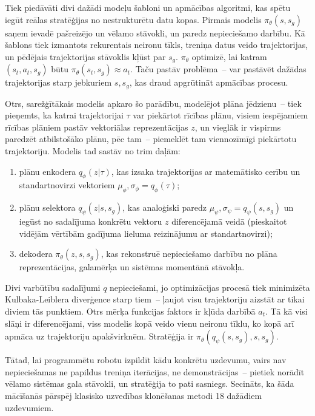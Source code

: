 \documentclass[12pt, a4paper]{article}
\numberwithin{equation}{section} %
\begin{document}
Tiek piedāvāti divi dažādi modeļu šabloni un apmācības algoritmi, kas spētu iegūt reālas stratēģijas no nestrukturētu datu kopas. Pirmais modelis $\pi_{\theta}(s,s_g)$ saņem ievadē pašreizējo un vēlamo stāvokli, un paredz nepieciešamo darbību. Kā šablons tiek izmantots rekurentais neironu tīkls, treniņa datus veido trajektorijas, un pēdējais trajektorijas stāvoklis kļūst par $s_g$. $\pi_{\theta}$ optimizē, lai katram $(s_t, a_t, s_g)$ būtu $\pi_{\theta}(s_t, s_g) \approx a_t$. Taču pastāv problēma~-- var pastāvēt dažādas trajektorijas starp jebkuriem $s, s_g$, kas draud apgrūtināt apmācības procesu.

Otrs, sarežģītākais modelis apkaro šo parādību, modelējot plāna jēdzienu~-- tiek pieņemts, ka katrai trajektorijai $\tau$ var piekārtot rīcības plānu, visiem iespējamiem rīcības plāniem pastāv vektoriālas reprezentācijas $z$, un vieglāk ir vispirms paredzēt atbilstošāko plānu, pēc tam~-- piemeklēt tam viennozīmīgi piekārtotu trajektoriju. Modelis tad sastāv no trim daļām:

\begin{enumerate}
    \item plānu enkodera $q_{\phi}(z \vert \tau)$, kas izsaka trajektorijas ar matemātisko cerību un standartnovirzi vektoriem $\mu_{\phi}, \sigma_{\phi} = q_{\phi}(\tau)$;
    \item plānu selektora $q_{\psi}(z \vert s, s_g)$, kas analoģiski paredz $\mu_{\psi}, \sigma_{\psi} = q_{\psi}(s, s_g)$ un iegūst no sadalījuma konkrētu vektoru $z$ diferencējamā veidā (pieskaitot vidējām vērtībām gadījuma lieluma reizinājumu ar standartnovirzi);
    \item dekodera $\pi_{\theta}(z, s, s_g)$, kas rekonstruē nepieciešamo darbību no plāna reprezentācijas, galamērķa un sistēmas momentānā stāvokļa.
\end{enumerate}

Divi varbūtību sadalījumi $q$ nepieciešami, jo optimizācijas procesā tiek minimizēta Kulbaka-Leiblera diverģence starp tiem~-- ļaujot visu trajektoriju aizstāt ar tikai diviem tās punktiem. Otrs mērķa funkcijas faktors ir kļūda darbībā $a_t$. Tā kā visi slāņi ir diferencējami, viss modelis kopā veido vienu neironu tīklu, ko kopā arī apmāca uz trajektoriju apakšvirknēm. Stratēģija ir $\pi_{\theta}(q_{\psi}(s, s_g), s, s_g)$.

Tātad, lai programmētu robotu izpildīt kādu konkrētu uzdevumu, vairs nav nepieciešamas ne papildus treniņa iterācijas, ne demonstrācijas~-- pietiek norādīt vēlamo sistēmas gala stāvokli, un stratēģija to pati sasniegs. Secināts, ka šāda mācīšanās pārspēj klasisko uzvedības klonēšanas metodi 18 dažādiem uzdevumiem.
\end{document}
